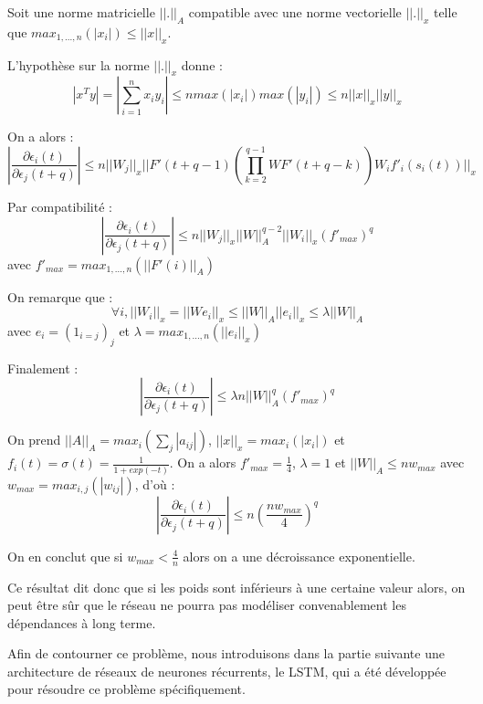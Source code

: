 Soit une norme matricielle $||.||_A$ compatible avec une norme vectorielle $||.||_x$ telle que $max_{1, ..., n}(|x_i|) \leq ||x||_x$.

L'hypothèse sur la norme $||.||_x$ donne :
$$
|x^Ty| = |\sum_{i=1}^{n}{x_iy_i}| \leq n max(|x_i|) max(|y_i|) \leq n||x||_x ||y||_x
$$

On a alors :
$$
|\frac{\partial \epsilon_i(t)}{\partial \epsilon_j(t+q)}| \leq n ||W_j||_x ||F'(t + q - 1)(\prod_{k = 2}^{q-1}{WF'(t + q - k)})W_if'_i(s_i(t))||_x
$$

Par compatibilité :
$$
|\frac{\partial \epsilon_i(t)}{\partial \epsilon_j(t+q)}| \leq n ||W_j||_x ||W||_A^{q-2} ||W_i||_x (f'_{max})^{q}
$$
avec $f'_{max} = max_{1, ..., n}(||F'(i)||_A)$

On remarque que :
$$
\forall i, ||W_i||_x = ||We_i||_x \leq ||W||_A ||e_i||_x \leq \lambda ||W||_A
$$
avec $e_i=(1_{i=j})_j$ et $\lambda = max_{1, ..., n}(||e_i||_x)$

Finalement :
$$
|\frac{\partial \epsilon_i(t)}{\partial \epsilon_j(t+q)}| \leq \lambda n ||W||_A^{q}(f'_{max})^{q}
$$

On prend $||A||_A = max_i(\sum_{j}{|a_{ij}|})$, $||x||_x = max_i(|x_i|)$ et $f_i(t) = \sigma(t) = \frac{1}{1+exp(-t)}$. On a alors $f'_{max} = \frac{1}{4}$, $\lambda = 1$ et $||W||_A \leq n w_{max}$ avec $w_{max} = max_{i,j}(|w_{ij}|)$, d'où :
$$
|\frac{\partial \epsilon_i(t)}{\partial \epsilon_j(t+q)}| \leq n (\frac{nw_{max}}{4})^{q}
$$

On en conclut que si $w_{max} < \frac{4}{n}$ alors on a une décroissance exponentielle.

Ce résultat dit donc que si les poids sont inférieurs à une certaine valeur alors, on peut être sûr que le réseau ne pourra pas modéliser convenablement les dépendances à long terme.

Afin de contourner ce problème, nous introduisons dans la partie suivante une architecture de réseaux de neurones récurrents, le LSTM, qui a été développée pour résoudre ce problème spécifiquement.